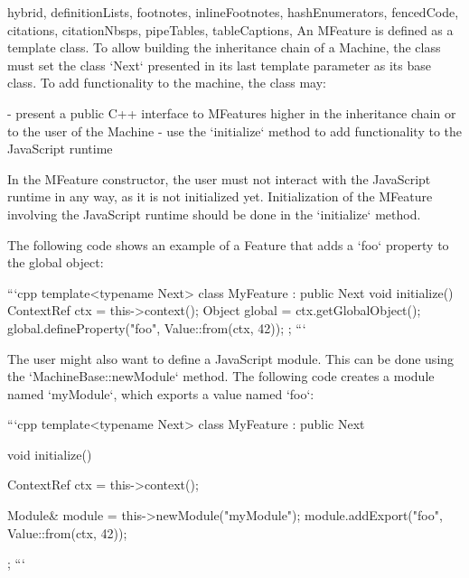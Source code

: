 \begin{markdown*}{%
  hybrid,
  definitionLists,
  footnotes,
  inlineFootnotes,
  hashEnumerators,
  fencedCode,
  citations,
  citationNbsps,
  pipeTables,
  tableCaptions,
}
An MFeature is defined as a template class. To allow building the inheritance chain of a Machine, the class must set the class `Next` presented in its last template parameter as its base class. To add functionality to the machine, the class may:

  - present a public C++ interface to MFeatures higher in the inheritance chain or to the user of the Machine
  - use the `initialize` method to add functionality to the JavaScript runtime

In the MFeature constructor, the user must not interact with the JavaScript runtime in any way, as it is not initialized yet. Initialization of the MFeature involving the JavaScript runtime should be done in the `initialize` method.

The following code shows an example of a Feature that adds a `foo` property to the global object:

```cpp
template<typename Next>
class MyFeature : public Next {
    void initialize() {
        ContextRef ctx = this->context();
        Object global = ctx.getGlobalObject();
        global.defineProperty("foo", Value::from(ctx, 42));
    }
};
```

The user might also want to define a JavaScript module. This can be done using the `MachineBase::newModule` method. The following code creates a module named `myModule`, which exports a value named `foo`:

```cpp
template<typename Next>
class MyFeature : public Next {
    void initialize() {
        ContextRef ctx = this->context();

        Module& module = this->newModule("myModule");
        module.addExport("foo", Value::from(ctx, 42));
    }
};
```


\end{markdown*}
